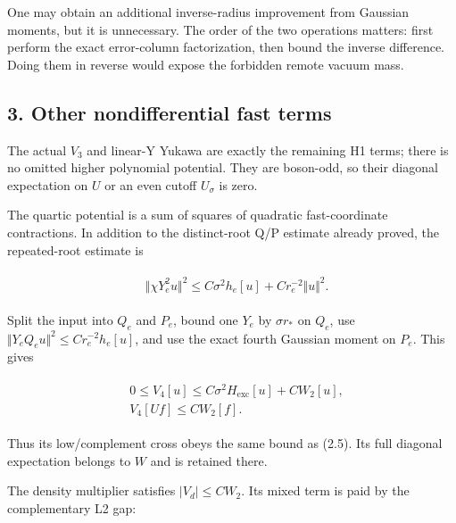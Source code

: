 One may obtain an additional inverse-radius improvement from Gaussian
moments, but it is unnecessary. The order of the two operations matters:
first perform the exact error-column factorization, then bound the
inverse difference. Doing them in reverse would expose the forbidden
remote vacuum mass.

\subsection{3. Other nondifferential fast
terms}\label{i-other-nondifferential-fast-terms}

The actual \(V_{3}\) and linear-Y Yukawa are exactly the remaining H1
terms; there is no omitted higher polynomial potential. They are
boson-odd, so their diagonal expectation on \(U\) or an even cutoff
\(U_{\sigma}\) is zero.

The quartic potential is a sum of squares of quadratic fast-coordinate
contractions. In addition to the distinct-root Q/P estimate already
proved, the repeated-root estimate is

\begin{gather*}
\begin{aligned}
& \Vert \chi  Y_{e}^{2} u\Vert ^{2} \le  C \sigma ^{2} h_{e}[u]+C r_{e}^{-2}\Vert u\Vert ^{2}.
\end{aligned}\tag{3.1}
\end{gather*}

Split the input into \(Q_{e}\) and \(P_{e}\), bound one \(Y_{e}\) by
\(\sigma  r_{*}\) on \(Q_{e}\), use
\(\Vert Y_{e} Q_{e} u\Vert ^{2}\le Cr_{e}^{-2}h_{e}[u]\), and use the
exact fourth Gaussian moment on \(P_{e}\). This gives

\begin{gather*}
\begin{aligned}
& 0\le V_{4}[u]\le C \sigma ^{2} H_{\mathrm{exc}}[u]+C W_{2}[u], \\
& V_{4}[Uf]\le C W_{2}[f].
\end{aligned}\tag{3.2}
\end{gather*}

Thus its low/complement cross obeys the same bound as (2.5). Its full
diagonal expectation belongs to \(W\) and is retained there.

The density multiplier satisfies \(\vert V_{d}\vert \le CW_{2}\). Its
mixed term is paid by the complementary L2 gap:

